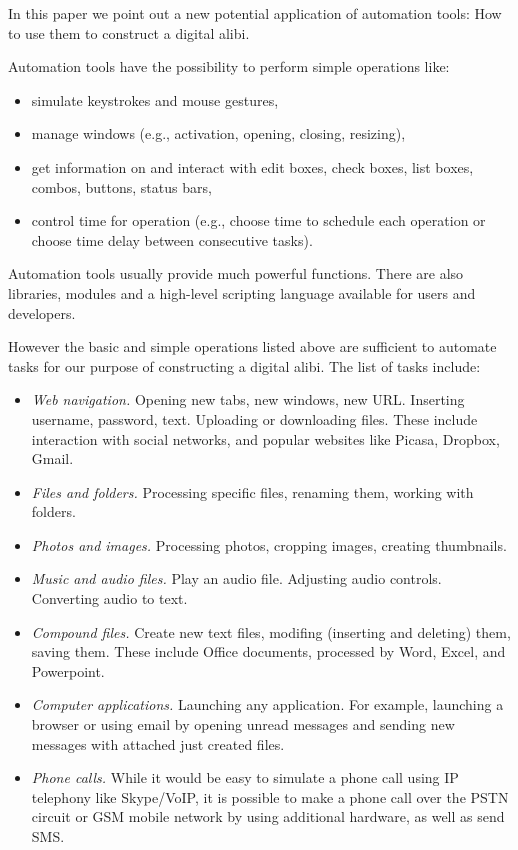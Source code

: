 \documentclass[runningheads,english]{llncs}
\begin{document}
In this paper we point out a new potential application of automation tools: How
to use them to construct a digital alibi.

Automation tools have the possibility to perform simple operations like:
\begin{itemize}
\item simulate keystrokes and mouse gestures, 
\item manage windows (e.g., activation, opening, closing, resizing),
\item get information on and interact with edit boxes, check boxes, list boxes,
combos, buttons, status bars,
\item control time for operation (e.g., choose time to schedule each operation
or choose time delay between consecutive tasks).
\end{itemize}

Automation tools usually provide much powerful functions. There are also
libraries, modules and a high-level scripting language available for users and
developers.

However the basic and simple operations listed above are sufficient to automate
tasks for our purpose of constructing a digital alibi. 
The list of tasks include:  
\begin{itemize}
\item {\em Web navigation.} Opening new tabs, new windows, new URL. Inserting
username, password, text. Uploading or downloading files. These include
interaction with social networks, and popular websites like Picasa, Dropbox,
Gmail.  
\item {\em Files and folders.} Processing specific files, renaming them, working
with folders.
\item {\em Photos and images.} Processing photos, cropping images, creating
thumbnails.
\item {\em Music and audio files.} Play an audio file. Adjusting audio controls.
Converting audio to text. 
\item {\em Compound files.} Create new text files, modifing (inserting and
deleting) them, saving them. These include Office documents, processed by Word,
Excel, and Powerpoint.
\item {\em Computer applications.} Launching any application. For example,
launching a browser or using email by opening unread messages and sending new
messages with attached just created files.
\item {\em Phone calls.} While it would be easy to simulate a phone call using
IP telephony like Skype/VoIP, it is possible to make a phone call over the PSTN
circuit or GSM mobile network by using additional hardware, as well as send SMS.
\end{itemize}
\end{document}
